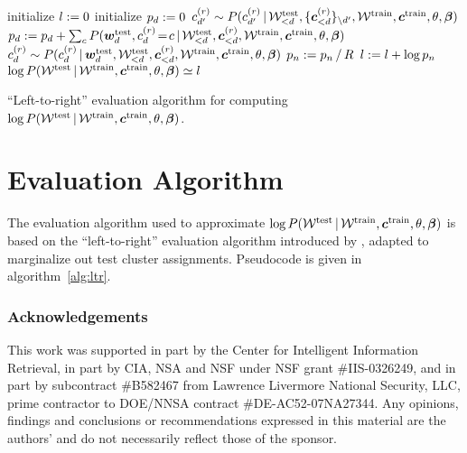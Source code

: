 \documentclass[twoside]{article}
\begin{document}
\begin{algorithm*}[t]
\begin{algorithmic}
\State initialize $l := 0$  \State initialize $p_d := 0$
  \State $c^{(r)}_{d'}
\sim P(c^{(r)}_{d'} \,|\, \mathcal{W}^{\textrm{test}}_{<d}, \{
\boldsymbol{c}^{(r)}_{< d} \}_{\setminus {d'}}, \mathcal{W}^{\textrm{train}},
\boldsymbol{c}^{\textrm{train}},\theta, \boldsymbol{\beta})$ \EndFor \State $p_d := p_d +
\sum_c P(\boldsymbol{w}^{\textrm{test}}_d, c^{(r)}_d \!=\! c \,|\,
\mathcal{W}^{\textrm{test}}_{<d},\boldsymbol{c}^{(r)}_{<d},
\mathcal{W}^{\textrm{train}}, \boldsymbol{c}^{\textrm{train}},\theta, \boldsymbol{\beta})$
\State $c^{(r)}_d \sim P(c^{(r)}_d \,|\, \boldsymbol{w}^{\textrm{test}}_d,
\mathcal{W}^{\textrm{test}}_{<d},\boldsymbol{c}^{(r)}_{<d},\mathcal{W}^{\textrm{train}},
  \boldsymbol{c}^{\textrm{train}},\theta,\boldsymbol{\beta})$
\EndFor
\State $p_n := p_n \,/\, R$
\State $l := l + \log{p_n}$
\EndFor
\State $\log{P(\mathcal{W}^{\textrm{test}} \,|\,\mathcal{W}^{\textrm{train}},            
  \boldsymbol{c}^{\textrm{train}}, \theta,
  \boldsymbol{\beta})} \simeq l$
\end{algorithmic}
\caption{``Left-to-right'' evaluation algorithm for computing
  $\log{P(\mathcal{W}^{\textrm{test}} \,|\,\mathcal{W}^{\textrm{train}},
  \boldsymbol{c}^{\textrm{train}}, \theta, \boldsymbol{\beta})}$.}
\label{alg:ltr}
\end{algorithm*}

\section{Evaluation Algorithm} \label{leftright}

The evaluation algorithm used to approximate
$\log{P(\mathcal{W}^{\textrm{test}} \,|\,\mathcal{W}^{\textrm{train}},
  \boldsymbol{c}^{\textrm{train}}, \theta, \boldsymbol{\beta})}$ is based on the
``left-to-right'' evaluation algorithm introduced by
\cite{wallach09evaluation}, adapted to marginalize out test cluster
assignments. Pseudocode is given in algorithm~\ref{alg:ltr}.

\subsubsection*{Acknowledgements}

{

\small

This work was supported in part by the Center for Intelligent
Information Retrieval, in part by CIA, NSA and NSF under NSF grant
\#IIS-0326249, and in part by subcontract \#B582467 from Lawrence
Livermore National Security, LLC, prime contractor to DOE/NNSA
contract \#DE-AC52-07NA27344. Any opinions, findings and conclusions
or recommendations expressed in this material are the authors' and do
not necessarily reflect those of the sponsor.

}
\end{document}
